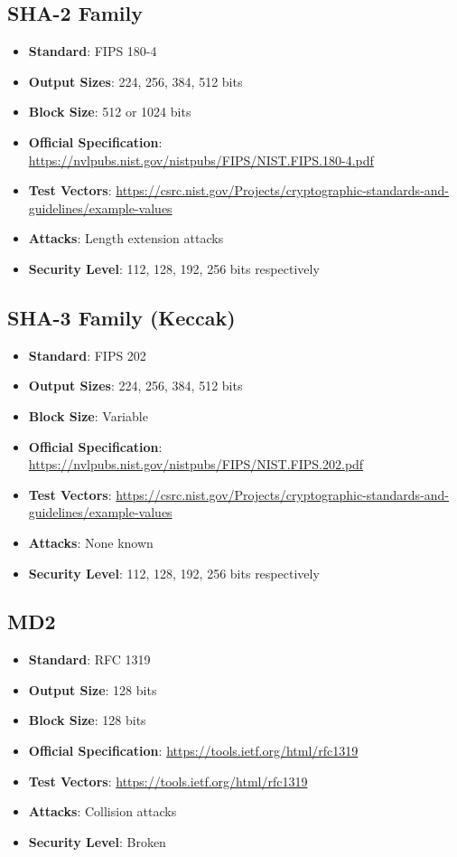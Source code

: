 \documentclass[11pt,a4paper]{article}
\begin{document}
\subsection{SHA-2 Family}
\begin{itemize}
    \item \textbf{Standard}: FIPS 180-4
    \item \textbf{Output Sizes}: 224, 256, 384, 512 bits
    \item \textbf{Block Size}: 512 or 1024 bits
    \item \textbf{Official Specification}: \url{https://nvlpubs.nist.gov/nistpubs/FIPS/NIST.FIPS.180-4.pdf}
    \item \textbf{Test Vectors}: \url{https://csrc.nist.gov/Projects/cryptographic-standards-and-guidelines/example-values}
    \item \textbf{Attacks}: Length extension attacks
    \item \textbf{Security Level}: 112, 128, 192, 256 bits respectively
\end{itemize}

\subsection{SHA-3 Family (Keccak)}
\begin{itemize}
    \item \textbf{Standard}: FIPS 202
    \item \textbf{Output Sizes}: 224, 256, 384, 512 bits
    \item \textbf{Block Size}: Variable
    \item \textbf{Official Specification}: \url{https://nvlpubs.nist.gov/nistpubs/FIPS/NIST.FIPS.202.pdf}
    \item \textbf{Test Vectors}: \url{https://csrc.nist.gov/Projects/cryptographic-standards-and-guidelines/example-values}
    \item \textbf{Attacks}: None known
    \item \textbf{Security Level}: 112, 128, 192, 256 bits respectively
\end{itemize}

\subsection{MD2}
\begin{itemize}
    \item \textbf{Standard}: RFC 1319
    \item \textbf{Output Size}: 128 bits
    \item \textbf{Block Size}: 128 bits
    \item \textbf{Official Specification}: \url{https://tools.ietf.org/html/rfc1319}
    \item \textbf{Test Vectors}: \url{https://tools.ietf.org/html/rfc1319}
    \item \textbf{Attacks}: Collision attacks
    \item \textbf{Security Level}: Broken
\end{itemize}
\end{document}

